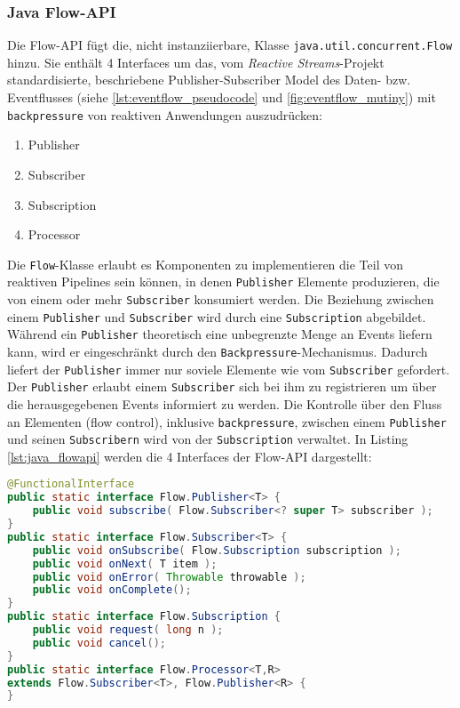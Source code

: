 \subsubsection{Java Flow-API}
\label{subsection:java_flow_api}
Die Flow-API fügt die, nicht instanziierbare, Klasse \verb|java.util.concurrent.Flow| hinzu. Sie enthält 4 Interfaces um das,
vom \textit{Reactive Streams}-Projekt standardisierte, beschriebene Publisher-Subscriber Model des Daten- bzw. Eventflusses
(siehe \ref{lst:eventflow_pseudocode} und \ref{fig:eventflow_mutiny}) mit \verb|backpressure|
von reaktiven Anwendungen auszudrücken:
\begin{enumerate}
    \item Publisher
    \item Subscriber
    \item Subscription
    \item Processor
\end{enumerate}

Die \verb|Flow|-Klasse erlaubt es Komponenten zu implementieren die Teil von reaktiven Pipelines sein können, in denen
\verb|Publisher| Elemente produzieren, die von einem oder mehr \verb|Subscriber| konsumiert werden. Die Beziehung zwischen einem
\verb|Publisher| und \verb|Subscriber| wird durch eine \verb|Subscription| abgebildet.
Während ein \verb|Publisher| theoretisch eine unbegrenzte Menge an Events liefern kann, wird er eingeschränkt durch den
\verb|Backpressure|-Mechanismus. Dadurch liefert der \verb|Publisher| immer nur soviele Elemente wie vom \verb|Subscriber| gefordert.
Der \verb|Publisher| erlaubt einem \verb|Subscriber| sich bei ihm zu registrieren um über die herausgegebenen Events informiert zu werden.
Die Kontrolle über den Fluss an Elementen (flow control), inklusive \verb|backpressure|, zwischen einem \verb|Publisher| und seinen \verb|Subscribern|
wird von der \verb|Subscription| verwaltet.
In Listing \ref{lst:java_flowapi} werden die 4 Interfaces der Flow-API dargestellt:
\begin{lstlisting}[language=java, caption=Die Klasse java.util.concurrent.Flow, captionpos=b, label=lst:java_flowapi]
@FunctionalInterface
public static interface Flow.Publisher<T> {
	public void subscribe( Flow.Subscriber<? super T> subscriber );
}
public static interface Flow.Subscriber<T> {
	public void onSubscribe( Flow.Subscription subscription );
	public void onNext( T item );
	public void onError( Throwable throwable );
	public void onComplete();
}
public static interface Flow.Subscription {
	public void request( long n );
	public void cancel();
}
public static interface Flow.Processor<T,R>
extends Flow.Subscriber<T>, Flow.Publisher<R> {
}
\end{lstlisting}\parencite[Kapitel 5.11]{JavaSE9StandardBibliothek}

